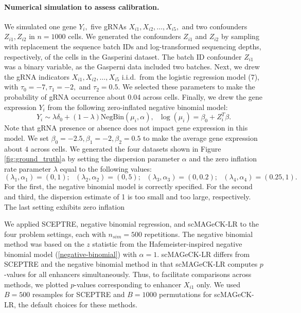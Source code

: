 \documentclass{nature}
\begin{document}
\paragraph{Numerical simulation to assess calibration.}

We simulated one gene $Y_i,$ five gRNAs $X_{i1}, X_{i2}, \dots, X_{i5},$ and two confounders $Z_{i1}, Z_{i2}$ in $n = 1000$ cells. We generated the confounders $Z_{i1}$ and $Z_{i2}$ by sampling with replacement the sequence batch IDs and log-transformed sequencing depths, respectively, of the cells in the Gasperini dataset. The batch ID confounder $Z_{i1}$ was a binary variable, as the Gasperni data included two batches. Next, we drew the gRNA indicators $X_{i1}, X_{i2}, \dots, X_{i5}$ i.i.d.\ from the logistic regression model (7), with $\tau_0 = -7, \tau_1 = -2,$ and $\tau_2 = 0.5$. We selected these parameters to make the probability of gRNA occurrence about 0.04 across cells. Finally, we drew the gene expression $Y_i$ from the following zero-inflated negative binomial model:
$$ Y_i \sim \lambda \delta_0 + (1 - \lambda) \textrm{NegBin}(\mu_i, \alpha), \textrm{ } \log(\mu_i) = \beta_0 + Z_i^T \beta.$$ Note that gRNA presence or absence does not impact gene expression in this model. 
We set $\beta_0 = -2.5, \beta_1 = -2, \beta_2 = 0.5$ to make the average gene expression about $4$ across cells. We generated the four datasets shown in Figure \ref{fig:ground_truth}a by setting the dispersion parameter $\alpha$ and the zero inflation rate parameter $\lambda$ equal to the following values:
$$ (\lambda_1, \alpha_1) = (0,1) ; \textrm{    } (\lambda_2, \alpha_2) = (0, 5); \textrm{     } (\lambda_3, \alpha_3) = (0, 0.2); \textrm{     } (\lambda_4, \alpha_4) = (0.25, 1).$$ For the first, the negative binomial model is correctly specified. For the second and third, the dispersion estimate of 1 is too small and too large, respectively. The last setting exhibits zero inflation

We applied SCEPTRE, negative binomial regression, and scMAGeCK-LR\cite{Yang2020} to the four problem settings, each with $n_{sim} = 500$ repetitions. The negative binomial method was based on the $z$ statistic from the Hafemeister-inspired negative binomial model (\ref{negative-binomial}) with $\alpha = 1$.  scMAGeCK-LR differs from SCEPTRE and the negative binomial method in that scMAGeCK-LR computes $p$-values for all enhancers simultaneously. Thus, to facilitate comparisons across methods, we plotted $p$-values corresponding to enhancer $X_{i1}$ only. We used $B = 500$ resamples for SCEPTRE and $B = 1000$ permutations for scMAGeCK-LR, the default choices for these methods.
\end{document}
